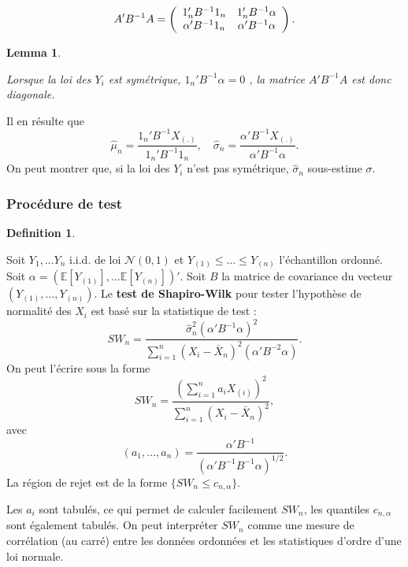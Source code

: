 \documentclass[
]{book}
\newtheorem{lemma}{Lemma}[chapter]
\theoremstyle{definition}
\newtheorem{definition}{Definition}[chapter]
\theoremstyle{definition}
\theoremstyle{definition}
\theoremstyle{definition}
\theoremstyle{remark}
\begin{document}
\[A'B^{-1} A =  \left( \begin{array}{c c } 1_n'B^{-1} 1_n & 1_n'B^{-1} \alpha \\ \alpha' B^{-1} 1_n & \alpha' B^{-1} \alpha \end{array}\right).\]

\begin{lemma}
\protect\hypertarget{lem:unlabeled-div-40}{}\label{lem:unlabeled-div-40}

Lorsque la loi des \(Y_i\) est symétrique, \(1_n'B^{-1} \alpha =0\) , la matrice \(A'B^{-1} A\) est donc diagonale.

\end{lemma}

Il en résulte que
\[\hat{\mu}_n= \frac{ 1_n'B^{-1} X_{(.)}}{ 1_n'B^{-1} 1_n},\quad \hat{\sigma}_n= \frac{ \alpha'B^{-1} X_{(.)}}{ \alpha'B^{-1} \alpha}.\]
On peut montrer que, si la loi des \(Y_i\) n'est pas symétrique, \(\hat{\sigma}_n\) sous-estime \(\sigma\).

\hypertarget{procuxe9dure-de-test}{%
\subsubsection{Procédure de test}\label{procuxe9dure-de-test}}

\begin{definition}
\protect\hypertarget{def:unlabeled-div-41}{}\label{def:unlabeled-div-41}

Soit \(Y_1, \ldots Y_n\) i.i.d. de loi \(\mathcal{N}(0,1)\) et \(Y_{(1)} \leq \ldots \leq Y_{(n)}\) l'échantillon ordonné.
Soit \(\alpha=(\mathbb{E}[Y_{(1)}], \ldots\mathbb{E}[Y_{(n)}] )'\). Soit \(B\) la matrice de covariance du vecteur \((Y_{(1)},\ldots , Y_{(n)})\).
Le \textbf{test de Shapiro-Wilk} pour tester l'hypothèse de normalité des \(X_i\) est basé sur la statistique de test :
\[ 
    SW_n=\frac{\hat{\sigma}_n^2 (\alpha' B^{-1} \alpha)^2}{\sum_{i=1}^n (X_i-\bar{X}_n)^2 (\alpha' B^{-2} \alpha)}.
\]
On peut l'écrire sous la forme
\[SW_n= \frac{\left(\sum_{i=1}^n a_i X_{(i)}\right)^2}{ \sum_{i=1}^n (X_i-\bar{X}_n)^2},\]
avec
\[(a_1, \ldots,a_n)=\frac{\alpha' B^{-1}}{(\alpha' B^{-1}B^{-1}\alpha)^{1/2}}.\]
La région de rejet est de la forme \(\{SW_n \leq c_{n, \alpha}\}\).

\end{definition}

Les \(a_i\) sont tabulés, ce qui permet de calculer facilement \(SW_n\), les quantiles \(c_{n,\alpha}\) sont également tabulés. On peut interpréter \(SW_n\) comme une mesure de corrélation (au carré) entre les données ordonnées et les statistiques d'ordre d'une loi normale.
\end{document}
